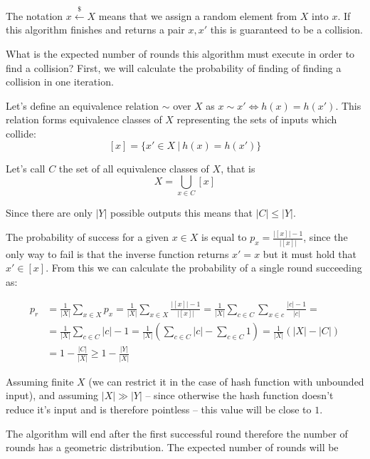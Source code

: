 \begin{algorithm}
\begin{algorithmic}[1]
			\State {}
		\EndIf
	\EndWhile
\end{algorithmic}
\end{algorithm}

The notation $x \overset{\$}{\gets} X$ means that we assign a random element from $X$ into $x$.
If this algorithm finishes and returns a pair $x, x'$ this is guaranteed to be a collision.

What is the expected number of rounds this algorithm must execute in order to find a collision?
First, we will calculate the probability of finding of finding a collision in one iteration.

Let's define an equivalence relation $\sim$ over $X$ as $x \sim x' \Leftrightarrow h(x) = h(x')$. 
This relation forms equivalence classes of $X$ representing the sets of inputs which collide:
\[
[x] = \{x' \in X ~|~ h(x) = h(x')\}
\]

Let's call $C$ the set of all equivalence classes of $X$, that is
\[
X = \bigcup_{x \in C} [x]
\]

Since there are only $|Y|$ possible outputs this means that $|C|\le|Y|$. 

The probability of success for a given $x \in X$ is equal to $p_x = \frac{|[x]| - 1}{|[x]|}$, since the only way to fail is that the inverse function returns $x' = x$ but it must hold that $x' \in [x]$.
From this we can calculate the probability of a single round succeeding as:

\begin{align*}
p_r &= \frac{1}{|X|}\sum_{x\in X} p_x = \frac{1}{|X|}\sum_{x\in X} \frac{|[x]| - 1}{|[x]|} = \frac{1}{|X|}\sum_{c\in C}\sum_{x\in c}\frac{|c| - 1}{|c|} = \\
&= \frac{1}{|X|}\sum_{c\in C} |c| - 1 = \frac{1}{|X|}\left(\sum_{c\in C} |c| - \sum_{c\in C}1\right) = \frac{1}{|X|}\left(|X| - |C|\right)\\
&=1 - \frac{|C|}{|X|} \ge 1 - \frac{|Y|}{|X|}
\end{align*}

Assuming finite $X$ (we can restrict it in the case of hash function with unbounded input), and assuming $|X| \gg |Y|$ -- since otherwise the hash function doesn't reduce it's input and is therefore pointless -- this value will be close to $1$.

The algorithm will end after the first successful round therefore the number of rounds has a geometric distribution.
The expected number of rounds will be

